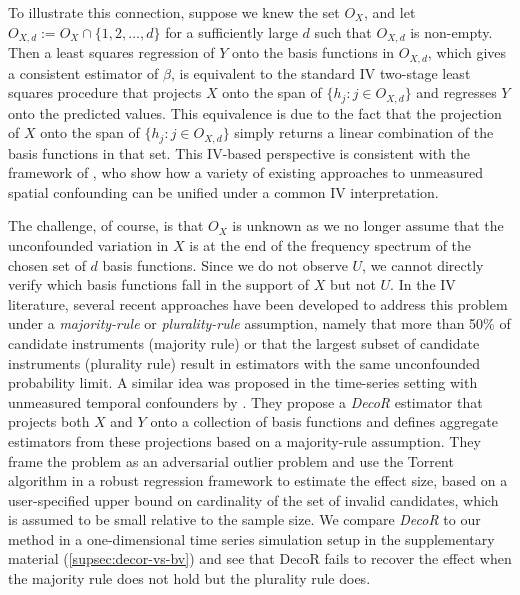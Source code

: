 \documentclass[
  12pt]{article}
\newcommand{\red}[1]{{\leavevmode\color{darkred}{#1}}}
\begin{document}
To illustrate this connection, suppose we knew the set $O_X$, and let $O_{X,d} := O_X \cap \{1,2,\ldots,d\}$ for a sufficiently large $d$ such that $O_{X,d}$ is non-empty. Then a least squares regression of $Y$ onto the basis functions in $O_{X,d}$, which gives a consistent estimator of $\beta$, is equivalent to the standard IV two-stage least squares procedure that projects $X$ onto the span of $\{h_j : j \in O_{X,d}\}$ and regresses $Y$ onto the predicted values.%
This equivalence is due to the fact that the projection of $X$ onto the span of $\{h_j : j \in O_{X,d}\}$ simply returns a linear combination of the basis functions in that set.  
This IV-based perspective is consistent with the framework of \citet{woodward2024instrumental}, who show how a variety of existing approaches to unmeasured spatial confounding can be unified under a common IV interpretation. 

The challenge, of course, is that $O_{X}$ is unknown as we no longer assume that the unconfounded variation in $X$ is at the end of the frequency spectrum of the chosen set of $d$ basis functions. Since we do not observe $U$, we cannot directly verify which basis functions fall in the support of $X$ but not $U$.
In the IV literature, several recent approaches have been developed to address this problem under a \textit{majority-rule} \citep[]{kang2016instrumental,windmeijer2019use} or \textit{plurality-rule}  \citep[]{hartwig2017robust,guo2018confidence} assumption, namely that more than 50\% of candidate instruments (majority rule) or that the largest subset of candidate instruments (plurality rule) 
result in estimators with the same unconfounded probability limit.  A similar idea was proposed in the time-series setting with unmeasured temporal confounders by \citet{schur2025decor}. They propose a  \textit{DecoR} estimator that  projects both $X$ and $Y$ onto a collection of basis functions and defines aggregate estimators from these projections based on a majority-rule assumption. 
They frame the problem as an adversarial outlier problem and use the Torrent algorithm \citep{bhatia2015robust} in a robust regression framework to estimate the effect size, based on a user-specified upper bound on cardinality of the set of invalid candidates, which is assumed to be small relative to the sample size. We compare \textit{DecoR}  to our method in a one-dimensional time series simulation setup in the supplementary material (\ref{supsec:decor-vs-bv}) and see that DecoR fails to recover the effect when the majority rule does not hold but the plurality rule does.
\end{document}
